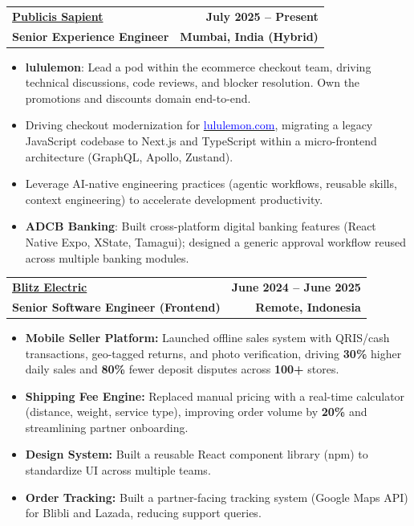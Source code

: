 \documentclass[a4paper,11pt]{article}
\makeatletter
\newcommand{\resumeExp}[4]{
\vspace{0mm}\item[]
    \begin{tabular*}{\textwidth}[t]{l@{\extracolsep{\fill}}r}
        \hspace{-4.4mm} \small\textbf{\textcolor{blue}{#1}} & {\footnotesize{#3}}\vspace{-1.2mm}\\
        \hspace{-4.3mm} \footnotesize{\textbf{#2}} & \footnotesize{#4}
    \end{tabular*}
    \vspace{-6.1mm}
}
\newcommand{\resumeItemListStart}{\begin{justify}\begin{itemize}[leftmargin=3ex, rightmargin=2ex, noitemsep,labelsep=1.2mm,itemsep=0mm]\small}
\newcommand{\resumeItemListEnd}{\end{itemize}\end{justify}\vspace{-1.5mm}}
\makeatother
\begin{document}
\resumeExp
{\href{https://www.publicissapient.com/}{Publicis Sapient}}
{Senior Experience Engineer}
{\textbf{July 2025 – Present}}
{\textbf{Mumbai, India (Hybrid)}}
\resumeItemListStart
\vspace{1mm}
\item[$\cdot$] \textbf{lululemon}: Lead a pod within the ecommerce checkout team, driving technical discussions, code reviews, and blocker resolution. Own the promotions and discounts domain end-to-end.
\item[$\cdot$] Driving checkout modernization for \href{https://shop.lululemon.com/}{\textcolor{blue}{lululemon.com}}, migrating a legacy JavaScript codebase to Next.js and TypeScript within a micro-frontend architecture (GraphQL, Apollo, Zustand).
\item[$\cdot$] Leverage AI-native engineering practices (agentic workflows, reusable skills, context engineering) to accelerate development productivity.
\item[$\cdot$] \textbf{ADCB Banking}: Built cross-platform digital banking features (React Native Expo, XState, Tamagui); designed a generic approval workflow reused across multiple banking modules.
\resumeItemListEnd

\vspace{2mm}
\resumeExp
{\href{https://www.blitzelectric.id/}{Blitz Electric}}
{Senior Software Engineer (Frontend)}
{\textbf{June 2024 – June 2025}}
{\textbf{Remote, Indonesia}}
\resumeItemListStart
\vspace{1mm}
\item[$\cdot$] \textbf{Mobile Seller Platform:} Launched offline sales system with QRIS/cash transactions, geo-tagged returns, and photo verification, driving \textbf{30\%} higher daily sales and \textbf{80\%} fewer deposit disputes across \textbf{100+} stores.
\item[$\cdot$] \textbf{Shipping Fee Engine:} Replaced manual pricing with a real-time calculator (distance, weight, service type), improving order volume by \textbf{20\%} and streamlining partner onboarding.
\item[$\cdot$] \textbf{Design System:} Built a reusable React component library (npm) to standardize UI across multiple teams.
\item[$\cdot$] \textbf{Order Tracking:} Built a partner-facing tracking system (Google Maps API) for Blibli and Lazada, reducing support queries.
\resumeItemListEnd
\end{document}
